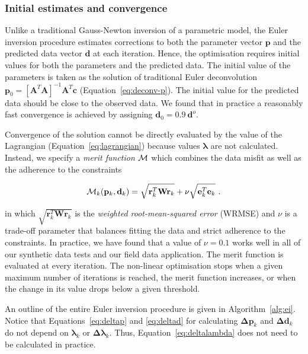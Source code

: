 \subsubsection{Initial estimates and convergence}

Unlike a traditional Gauss-Newton inversion of a parametric model, the Euler
inversion procedure estimates corrections to both the parameter vector
$\mathbf{p}$ and the predicted data vector $\mathbf{d}$ at each iteration.
Hence, the optimisation requires initial values for both the parameters and the
predicted data.
The initial value of the parameters is taken as the solution of
traditional Euler deconvolution
$\mathbf{p}_0 = \left[\mathbf{A}^T\mathbf{A}\right]^{-1}\mathbf{A}^T\mathbf{c}$
(Equation~\ref{eq:deconv-p}).
The initial value for the predicted data should be close to the observed data.
We found that in practice a reasonably fast convergence is achieved by
assigning $\mathbf{d}_0 = 0.9\ \mathbf{d}^o$.

Convergence of the solution cannot be directly evaluated by the value of the Lagrangian
(Equation~\ref{eq:lagrangian}) because values $\boldsymbol{\lambda}$ are
not calculated.
Instead, we specify a \textit{merit function} $\operatorname{\mathcal{M}}$ which combines the data
misfit as well as the adherence to the constraints

\begin{equation}
  \operatorname{\mathcal{M}}_k(\mathbf{p}_k, \mathbf{d}_k) =
  \sqrt{\mathbf{r}_k^T\mathbf{W}\mathbf{r}_k}
  + \nu\sqrt{\mathbf{e}_k^T\mathbf{e}_k}
  \ .
  \label{eq:merit}
\end{equation}

\noindent
in which $\sqrt{\mathbf{r}_k^T\mathbf{W}\mathbf{r}_k}$ is the
\textit{weighted root-mean-squared error} (WRMSE) and
$\nu$ is a trade-off parameter that balances fitting the data and strict adherence
to the constraints.
In practice, we have found that a value of $\nu=0.1$ works well in all of our
synthetic data tests and our field data application.
The merit function is evaluated at every iteration.
The non-linear optimisation stops when a given maximum number of iterations is
reached, the merit function increases, or when the change in its value drops
below a given threshold.

An outline of the entire Euler inversion procedure is given in
Algorithm~\ref{alg:ei}.
Notice that Equations~\ref{eq:deltap} and \ref{eq:deltad} for calculating
$\mathbf{\Delta p}_k$ and $\mathbf{\Delta d}_k$ do not depend on
$\boldsymbol{\lambda}_k$ or $\boldsymbol{\Delta\lambda}_k$.
Thus, Equation~\ref{eq:deltalambda} does not need to be calculated in practice.

